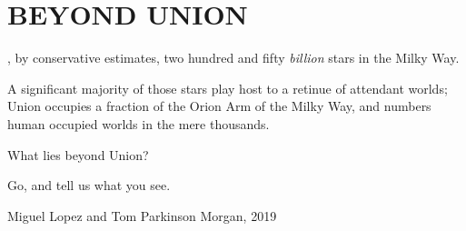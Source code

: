 \chapter{BEYOND UNION}

, by conservative estimates, two hundred and fifty \textit{billion} stars in the Milky Way.

A significant majority of those stars play host to a retinue of attendant worlds; Union occupies a
fraction of the Orion Arm of the Milky Way, and numbers human occupied worlds in the mere
thousands.

What lies beyond Union?

Go, and tell us what you see.

\vspace{5cm}

Miguel Lopez and Tom Parkinson Morgan, 2019

